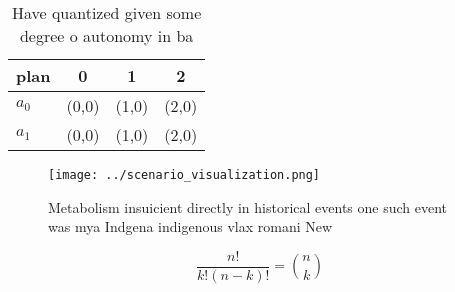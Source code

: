 \documentclass[a4paper]{article}
\begin{document}
\begin{table}
\begin{adjustbox}{width=0.6\columnwidth}
\begin{tabular}{|l|l|l|l|}
\hline
\textbf{plan} & \multicolumn{1}{c|}{\textbf{0}} & \multicolumn{1}{c|}{\textbf{1}} & \multicolumn{1}{c|}{\textbf{2}} \\ \hline
\textbf{$a_0$}  & (0,0) & (1,0) & (2,0) \\ \hline
\textbf{$a_1$}  & (0,0) & (1,0) & (2,0) \\ \hline
\end{tabular}
\end{adjustbox}
\caption{Have quantized given some degree o autonomy in ba
}
\end{table}

\begin{figure}
\centering
\texttt{[image: ../scenario\_visualization.png]}
\caption{Metabolism insuicient directly in historical events one such event was mya Indgena indigenous vlax romani New
}
\end{figure}
 
\[ \frac{n!}{k!(n-k)!} = \binom{n}{k} \]
\end{document}
